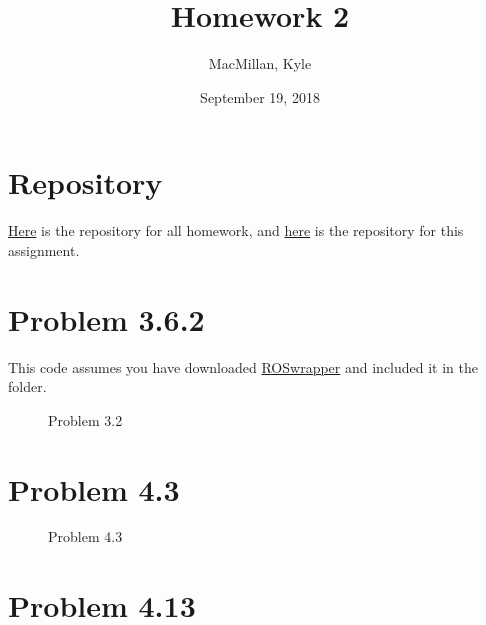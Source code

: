 \documentclass{article}
\title{\textbf{Homework 2}}
\author{MacMillan, Kyle}
\date{September 19, 2018}
\begin{document}
\maketitle

\newpage
\tableofcontents
{}




\newpage
\hypersetup{
    colorlinks,
    citecolor=blue,
    filecolor=black,
    linkcolor=blue,
    urlcolor=blue
}

\setcounter{page}{1}
\section{\textbf{Repository}}
\href{https://github.com/macattackftw/RoboticsHW}{Here} is the repository for all homework, and \href{https://github.com/macattackftw/RoboticsHW/tree/master/HW2}{here} is the repository for this assignment.

\newpage
\section{\textbf{Problem 3.6.2}}
This code assumes you have downloaded \href{https://github.com/macattackftw/ROSwrapper}{ROSwrapper} and included it in the folder.


\newpage
\begin{figure}[htbp]
  \centering
  
  \caption{Problem 3.2}
\end{figure}


\newpage
\section{\textbf{Problem 4.3}}


\newpage
\begin{figure}[htbp]
  \centering
  
  \caption{Problem 4.3}
\end{figure}


\newpage
\section{\textbf{Problem 4.13}}

\end{document}

